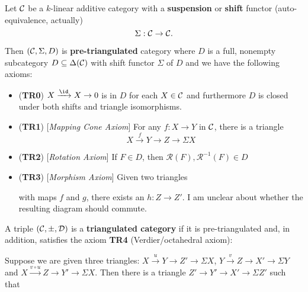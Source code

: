 \documentclass[12pt]{article}
\begin{document}
\begin{defn}
	Let $\cal C$ be a $k$-linear additive category with a \textbf{suspension} or \textbf{shift} functor (auto-equivalence, actually)
	\[\Sigma:\cal C\to\cal C.\]

	Then $({\cal C}, \Sigma ,D)$ is \textbf{pre-triangulated} category where $D$ is a full, nonempty subcategory $D\subseteq\Delta(\cal C)$
	with shift functor $\Sigma$ of $D$ and we have the following axioms:
	\begin{itemize}
		\item (\textbf{TR0}) $X\xrightarrow{\id} X\to 0$ is in $D$ for each $X\in \cal C$ and furthermore $D$ is closed under both shifts and triangle isomorphisms.
		\item (\textbf{TR1}) [\textit{Mapping Cone Axiom}] For any $f:X\to Y$ in $\cal C$, there is a triangle
		\[X\xrightarrow{f} Y\to Z\to\Sigma X\]
		\item (\textbf{TR2}) [\textit{Rotation Axiom}] If $F\in D$, then $\mathscr R(F),\mathscr R^{-1}(F)\in D$
		\item (\textbf{TR3}) [\textit{Morphism Axiom}] Given two triangles 
		\begin{center}
		\end{center}
		with maps $f$ and $g$, there exists an $h:Z\to Z'$. I am unclear about whether the resulting diagram should commute.
	\end{itemize}
\end{defn}
\begin{defn}
	A triple $(\cal C,\Sigma, D)$ is a \textbf{triangulated category} if it is pre-triangulated and, in addition,
	satisfies the axiom \textbf{TR4} (Verdier/octahedral axiom):

	Suppose we are given three triangles: $X\xrightarrow{u}Y\to Z'\to\Sigma X$, $Y\xrightarrow{v}Z\to X'\to\Sigma Y$
	and $X\xrightarrow{v\circ u} Z\to Y'\to\Sigma X$. Then there is a triangle $Z'\to Y'\to X'\to\Sigma Z'$ such that
	\begin{center}
	\end{center}
\end{defn}
\end{document}
